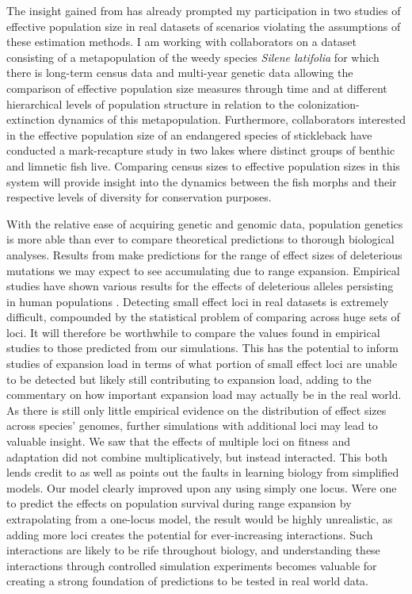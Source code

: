The insight gained from  has already prompted my participation in two studies of effective population size in real datasets of scenarios violating the assumptions of these estimation methods. I am working with collaborators on a dataset consisting of a metapopulation of the weedy species \emph{Silene latifolia} for which there is long-term census data and multi-year genetic data allowing the comparison of effective population size measures through time and at different hierarchical levels of population structure in relation to the colonization-extinction dynamics of this metapopulation. Furthermore, collaborators interested in the effective population size of an endangered species of stickleback have conducted a mark-recapture study in two lakes where distinct groups of benthic and limnetic fish live. Comparing census sizes to effective population sizes in this system will provide insight into the dynamics between the fish morphs and their respective levels of diversity for conservation purposes.

With the relative ease of acquiring genetic and genomic data, population genetics is more able than ever to compare theoretical predictions to thorough biological analyses. Results from  make predictions for the range of effect sizes of deleterious mutations we may expect to see accumulating due to range expansion. Empirical studies have shown various results for the effects of deleterious alleles persisting in human populations \citep{Henn:2015, Lohmueller:2008, Do:2015}. Detecting small effect loci in real datasets is extremely difficult, compounded by the statistical problem of comparing across huge sets of loci. It will therefore be worthwhile to compare the values found in empirical studies to those predicted from our simulations. This has the potential to inform studies of expansion load in terms of what portion of small effect loci are unable to be detected but likely still contributing to expansion load, adding to the commentary on how important expansion load may actually be in the real world. As there is still only little empirical evidence on the distribution of effect sizes across species' genomes, further simulations with additional loci may lead to valuable insight. We saw that the effects of multiple loci on fitness and adaptation did not combine multiplicatively, but instead interacted. This both lends credit to as well as points out the faults in learning biology from simplified models. Our model clearly improved upon any using simply one locus. Were one to predict the effects on population survival during range expansion by extrapolating from a one-locus model, the result would be highly unrealistic, as adding more loci creates the potential for ever-increasing interactions. Such interactions are likely to be rife throughout biology, and understanding these interactions through controlled simulation experiments becomes valuable for creating a strong foundation of predictions to be tested in real world data. 

